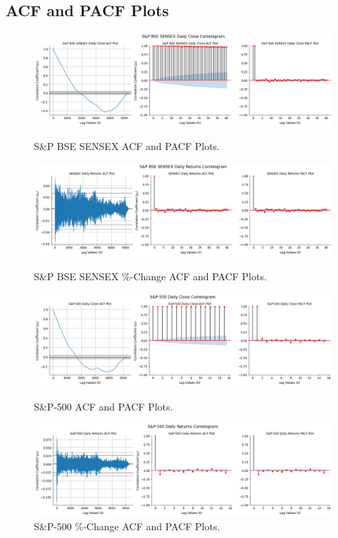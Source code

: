 \documentclass[conference]{IEEEtran}
\begin{document}
\onecolumn
\subsection{ACF and PACF Plots}
\begin{figure}[htbp]
	\centering
	\includegraphics[width = 0.78 \textwidth]{images/SENSEX ACF and PACF Plot.png}
	\caption{S\&P BSE SENSEX ACF and PACF Plots.}
	\label{fig: s_and_p_bse_sensex_acf_and_pcf_plots}
	
	\includegraphics[width = 0.78 \textwidth]{images/SENSEX Change ACF, PACF Plots.png}
	\caption{S\&P BSE SENSEX \%-Change ACF and PACF Plots.}
	\label{fig: s_and_p_bse_sensex_percentage_change_acf_and_pacf_plots}
	
	\includegraphics[width = 0.78 \textwidth]{images/S&P-500 ACF, PACF Plots.png}
	\caption{S\&P-500 ACF and PACF Plots.}
	\label{fig: s_and_p_500_acf_and_pacf_plots}
	
	\includegraphics[width = 0.78 \textwidth]{images/S&P-500 Change ACF PACF Plot.png}
	\caption{S\&P-500 \%-Change ACF and PACF Plots.}
	\label{fig: s_and_p_500_percentage_change_acf_and_pacf_plots}
\end{figure}
\end{document}
